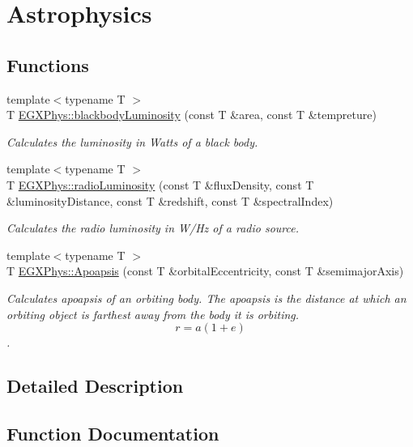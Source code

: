 \hypertarget{group___astrophysics}{}\section{Astrophysics}
\label{group___astrophysics}
\subsection*{Functions}
\begin{DoxyCompactItemize}
\item 
{\footnotesize template$<$typename T $>$ }\\T \hyperlink{group___astrophysics_ga909f82edfaed449b44e94788b642ebb8}{E\+G\+X\+Phys\+::blackbody\+Luminosity} (const T \&area, const T \&tempreture)
\begin{DoxyCompactList}\small\item\em Calculates the luminosity in Watts of a black body. \end{DoxyCompactList}\item 
{\footnotesize template$<$typename T $>$ }\\T \hyperlink{group___astrophysics_ga6d6865b2aac1bc7c7f06b7c4ac2444e4}{E\+G\+X\+Phys\+::radio\+Luminosity} (const T \&flux\+Density, const T \&luminosity\+Distance, const T \&redshift, const T \&spectral\+Index)
\begin{DoxyCompactList}\small\item\em Calculates the radio luminosity in W/\+Hz of a radio source. \end{DoxyCompactList}\item 
{\footnotesize template$<$typename T $>$ }\\T \hyperlink{group___astrophysics_gaf962e650bf84a568458e8eb39b1c61ba}{E\+G\+X\+Phys\+::\+Apoapsis} (const T \&orbital\+Eccentricity, const T \&semimajor\+Axis)
\begin{DoxyCompactList}\small\item\em Calculates apoapsis of an orbiting body. The apoapsis is the distance at which an orbiting object is farthest away from the body it is orbiting. \[r=a(1+e)\]. \end{DoxyCompactList}\end{DoxyCompactItemize}


\subsection{Detailed Description}


\subsection{Function Documentation}
\mbox{\label{group___astrophysics_gaf962e650bf84a568458e8eb39b1c61ba}} 

